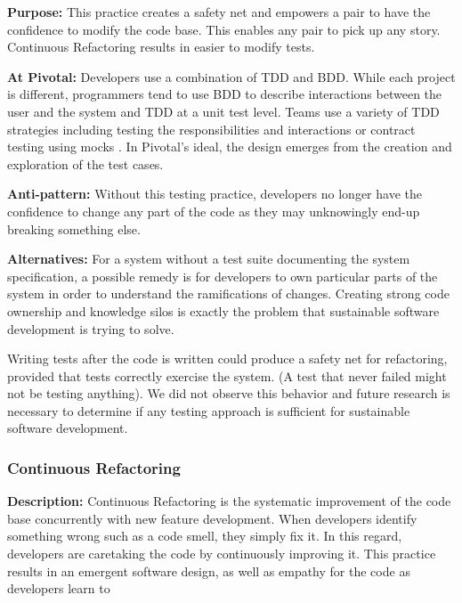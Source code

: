 \textbf{Purpose:} This practice creates a safety net and empowers a pair to have the confidence to modify the code base. This enables any pair to pick up any story. Continuous Refactoring results in easier to modify tests.

\textbf{At Pivotal:} Developers use a combination of TDD and BDD. While each project is different, programmers tend to use BDD to describe interactions between the user and the system and TDD at a unit test level. Teams use a variety of TDD strategies including testing the responsibilities and interactions \cite{Goose} or contract testing using mocks \cite{RainsbergerIntegrationTestsYouTube}. In Pivotal's ideal, the design emerges from the creation and exploration of the test cases. 

\textbf{Anti-pattern:} Without this testing practice, developers no longer have the confidence to change any part of the code as they may unknowingly end-up breaking something else. 

\textbf{Alternatives:} For a system without a test suite documenting the system specification, a possible remedy is for developers to own particular parts of the system in order to understand the ramifications of changes. Creating strong code ownership and knowledge silos is exactly the problem that sustainable software development is trying to solve.

Writing tests after the code is written could produce a safety net for refactoring, provided that tests correctly exercise the system. (A test that never failed might not be testing anything). We did not observe this behavior and future research is necessary to determine if any testing approach is sufficient for sustainable software development.

\subsubsection{Continuous Refactoring}
\textbf{Description:} Continuous Refactoring is the systematic improvement of the code base concurrently with new feature development. When developers identify something wrong such as a code smell, they simply fix it. In this regard, developers are caretaking the code by continuously improving it. This practice results in an emergent software design, as well as empathy for the code as developers learn to  


